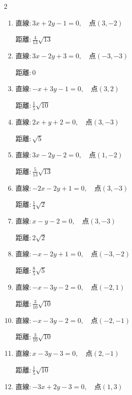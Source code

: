 \begin{multicols}{2}
\begin{enumerate}
        $\displaystyle 距離 : 2\sqrt{5}$

  \item $直線:3x+2y-1=0,\quad 点 ( 3, -2 )$

        $\displaystyle 距離 : \frac{4}{13}\sqrt{13}$

  \item $直線:3x-2y+3=0,\quad 点 ( -3, -3 )$

        $\displaystyle 距離 : 0$

  \item $直線:-x+3y-1=0,\quad 点 ( 3, 2 )$

        $\displaystyle 距離 : \frac{1}{5}\sqrt{10}$

  \item $直線:2x+y+2=0,\quad 点 ( 3, -3 )$

        $\displaystyle 距離 : \sqrt{5}$

\columnbreak %

\resetques

  \item $直線:3x-2y-2=0,\quad 点 ( 1, -2 )$

        $\displaystyle 距離 : \frac{5}{13}\sqrt{13}$

  \item $直線:-2x-2y+1=0,\quad 点 ( 3, -3 )$

        $\displaystyle 距離 : \frac{1}{4}\sqrt{2}$

  \item $直線:x-y-2=0,\quad 点 ( 3, -3 )$

        $\displaystyle 距離 : 2\sqrt{2}$

  \item $直線:-x-2y+1=0,\quad 点 ( -3, -2 )$

        $\displaystyle 距離 : \frac{8}{5}\sqrt{5}$

  \item $直線:-x-3y-2=0,\quad 点 ( -2, 1 )$

        $\displaystyle 距離 : \frac{3}{10}\sqrt{10}$

  \item $直線:-x-3y-2=0,\quad 点 ( -2, -1 )$

        $\displaystyle 距離 : \frac{3}{10}\sqrt{10}$

  \item $直線:x-3y-3=0,\quad 点 ( 2, -1 )$

        $\displaystyle 距離 : \frac{1}{5}\sqrt{10}$

  \item $直線:-3x+2y-3=0,\quad 点 ( 1, 3 )$


\end{enumerate}
\end{multicols}
